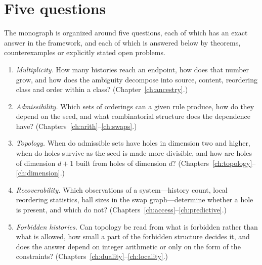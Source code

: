 \section{Five questions}
The monograph is organized around five questions, each of which has an exact answer in the framework, and each of which is answered below by theorems, counterexamples or explicitly stated open problems.
\begin{enumerate}[label=\textbf{Q\arabic*.},leftmargin=2.6em]
\item \emph{Multiplicity.} How many histories reach an endpoint, how does that number grow, and how does the ambiguity decompose into source, content, reordering class and order within a class? (Chapter~\ref{ch:ancestry}.)
\item \emph{Admissibility.} Which sets of orderings can a given rule produce, how do they depend on the seed, and what combinatorial structure does the dependence have? (Chapters~\ref{ch:arith}--\ref{ch:swaps}.)
\item \emph{Topology.} When do admissible sets have holes in dimension two and higher, when do holes survive as the seed is made more divisible, and how are holes of dimension $d{+}1$ built from holes of dimension $d$? (Chapters~\ref{ch:topology}--\ref{ch:dimension}.)
\item \emph{Recoverability.} Which observations of a system---history count, local reordering statistics, ball sizes in the swap graph---determine whether a hole is present, and which do not? (Chapters~\ref{ch:access}--\ref{ch:predictive}.)
\item \emph{Forbidden histories.} Can topology be read from what is forbidden rather than what is allowed, how small a part of the forbidden structure decides it, and does the answer depend on integer arithmetic or only on the form of the constraints? (Chapters~\ref{ch:duality}--\ref{ch:locality}.)
\end{enumerate}

